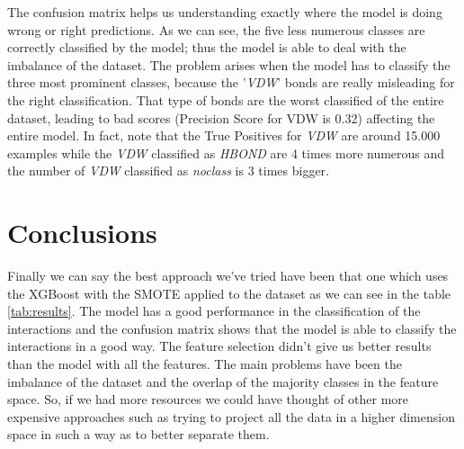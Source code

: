\documentclass[10pt,twocolumn,letterpaper]{article}
\begin{document}
The confusion matrix helps us understanding exactly where the model is doing wrong or right predictions. As we can see, the five less numerous classes are correctly classified by the model; thus the model is able to deal with the imbalance of the dataset. The problem arises when the model has to classify the three most prominent classes, because the '\textit{VDW}' bonds are really misleading for the right classification. That type of bonds are the worst classified of the entire dataset, leading to bad scores (Precision Score for VDW is 0.32) affecting the entire model. In fact, note that the True Positives for \textit{VDW} are around 15.000 examples while the \textit{VDW} classified as \textit{HBOND} are 4 times more numerous and the number of \textit{VDW} classified as \textit{noclass} is 3 times bigger.

\section{Conclusions}
Finally we can say the best approach we've tried have been that one which uses the XGBoost 
with the SMOTE applied to the dataset as we can see in the table \ref{tab:results}. The model has a good performance in the classification of the 
interactions and the confusion matrix shows that the model is able to classify the interactions in a good way. 
The feature selection didn't give us better results than the model with all the features. 
The main problems have been the imbalance of the dataset and the overlap of the majority classes in the 
feature space. So, if we had more resources we could have thought of other more expensive approaches such as 
trying to project all the data in a higher dimension space in such a way as to better separate them.
{\small


}
\end{document}
